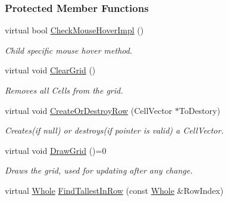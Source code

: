 \subsubsection*{Protected Member Functions}
\begin{DoxyCompactItemize}
\item 
\hypertarget{classMezzanine_1_1UI_1_1CellGrid_afa0f32da1b7d071b39ff67de54a64433}{
virtual bool \hyperlink{classMezzanine_1_1UI_1_1CellGrid_afa0f32da1b7d071b39ff67de54a64433}{CheckMouseHoverImpl} ()}
\label{classMezzanine_1_1UI_1_1CellGrid_afa0f32da1b7d071b39ff67de54a64433}

\begin{DoxyCompactList}\small\item\em Child specific mouse hover method. \item\end{DoxyCompactList}\item 
\hypertarget{classMezzanine_1_1UI_1_1CellGrid_a700671c77d5693a51fa2e91cbe0fe83b}{
virtual void \hyperlink{classMezzanine_1_1UI_1_1CellGrid_a700671c77d5693a51fa2e91cbe0fe83b}{ClearGrid} ()}
\label{classMezzanine_1_1UI_1_1CellGrid_a700671c77d5693a51fa2e91cbe0fe83b}

\begin{DoxyCompactList}\small\item\em Removes all Cells from the grid. \item\end{DoxyCompactList}\item 
\hypertarget{classMezzanine_1_1UI_1_1CellGrid_a4f4f640eda426025bf0b805b493c4db7}{
virtual void \hyperlink{classMezzanine_1_1UI_1_1CellGrid_a4f4f640eda426025bf0b805b493c4db7}{CreateOrDestroyRow} (CellVector $\ast$ToDestory)}
\label{classMezzanine_1_1UI_1_1CellGrid_a4f4f640eda426025bf0b805b493c4db7}

\begin{DoxyCompactList}\small\item\em Creates(if null) or destroys(if pointer is valid) a CellVector. \item\end{DoxyCompactList}\item 
\hypertarget{classMezzanine_1_1UI_1_1CellGrid_a1ad33a244734039541f3514b2d1c2570}{
virtual void \hyperlink{classMezzanine_1_1UI_1_1CellGrid_a1ad33a244734039541f3514b2d1c2570}{DrawGrid} ()=0}
\label{classMezzanine_1_1UI_1_1CellGrid_a1ad33a244734039541f3514b2d1c2570}

\begin{DoxyCompactList}\small\item\em Draws the grid, used for updating after any change. \item\end{DoxyCompactList}\item 
\hypertarget{classMezzanine_1_1UI_1_1CellGrid_a6a151cdcda0a044003696b32ec0f50b3}{
virtual \hyperlink{namespaceMezzanine_adcbb6ce6d1eb4379d109e51171e2e493}{Whole} \hyperlink{classMezzanine_1_1UI_1_1CellGrid_a6a151cdcda0a044003696b32ec0f50b3}{FindTallestInRow} (const \hyperlink{namespaceMezzanine_adcbb6ce6d1eb4379d109e51171e2e493}{Whole} \&RowIndex)}
\label{classMezzanine_1_1UI_1_1CellGrid_a6a151cdcda0a044003696b32ec0f50b3}


\end{DoxyCompactItemize}
